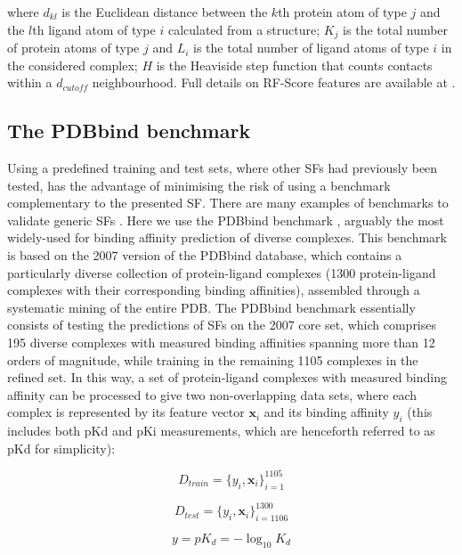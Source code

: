where $d_{kl}$ is the Euclidean distance between the $k$th protein atom of type $j$ and the $l$th ligand atom of type $i$ calculated from a structure; $K_j$ is the total number of protein atoms of type $j$ and $L_i$ is the total number of ligand atoms of type $i$ in the considered complex; $H$ is the Heaviside step function that counts contacts within a $d_{cutoff}$ neighbourhood. Full details on RF-Score features are available at \citep{564}.

\subsection{The PDBbind benchmark}

Using a predefined training and test sets, where other SFs had previously been tested, has the advantage of minimising the risk of using a benchmark complementary to the presented SF. There are many examples of benchmarks to validate generic SFs \citep{1455,1456,571,1457}. Here we use the PDBbind benchmark \citep{1313}, arguably the most widely-used for binding affinity prediction of diverse complexes. This benchmark is based on the 2007 version of the PDBbind database, which contains a particularly diverse collection of protein-ligand complexes (1300 protein-ligand complexes with their corresponding binding affinities), assembled through a systematic mining of the entire PDB. The PDBbind benchmark essentially consists of testing the predictions of SFs on the 2007 core set, which comprises 195 diverse complexes with measured binding affinities spanning more than 12 orders of magnitude, while training in the remaining 1105 complexes in the refined set. In this way, a set of protein-ligand complexes with measured binding affinity can be processed to give two non-overlapping data sets, where each complex is represented by its feature vector $\mathbf x_i$ and its binding affinity $y_i$ (this includes both pKd and pKi measurements, which are henceforth referred to as pKd for simplicity):

\begin{equation}
\label{rfscore3:D_train}
D_{train}=\{y_i,\mathbf x_i\}_{i=1}^1105
\end{equation}

\begin{equation}
\label{rfscore3:D_test}
D_{test}=\{y_i,\mathbf x_i\}_{i=1106}^1300
\end{equation}

\begin{equation}
\label{rfscore3:y}
y=pK_d=-\log_{10}K_d
\end{equation}

